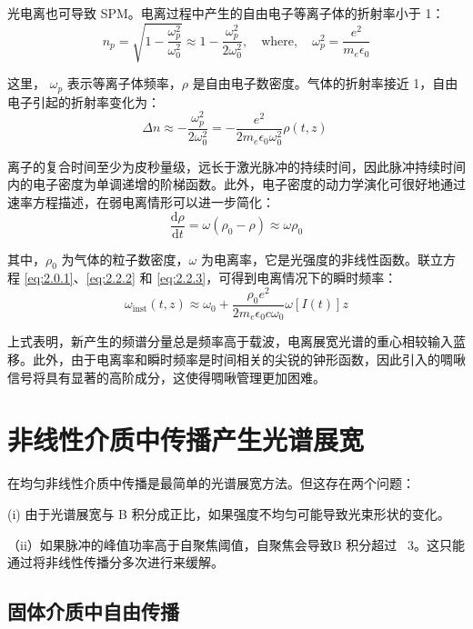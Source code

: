 \documentclass[14pt,a4paper,oneside]{article}
\numberwithin{equation}{subsection}             %
\numberwithin{figure}{subsection}               %
\begin{document}
光电离也可导致 SPM。电离过程中产生的自由电子等离子体的折射率小于 1：
\begin{equation}
    n_p=\sqrt{1-\frac{\omega_p^2}{\omega_0^2}}\approx1-\frac{\omega_p^2}{2\omega_0^2},\quad\text{where},\quad \omega_p^2=\frac{e^2}{m_e\epsilon_0}
    \label{eq:2.2.1}
\end{equation}

这里， $\omega_p$ 表示等离子体频率，$\rho$ 是自由电子数密度。气体的折射率接近 1，自由电子引起的折射率变化为：
\begin{equation}
    \Delta n\approx-\frac{\omega_p^2}{2ω_0^2}=-\frac{e^2}{2m_e\epsilon_0\omega_0^2}\rho(t,z)\
    \label{eq:2.2.2}
\end{equation}

离子的复合时间至少为皮秒量级，远长于激光脉冲的持续时间，因此脉冲持续时间内的电子密度为单调递增的阶梯函数。此外，电子密度的动力学演化可很好地通过速率方程描述，在弱电离情形可以进一步简化：
\begin{equation}
    \frac{\mathrm{d}\rho}{\mathrm{d}t}=\omega (\rho_0-\rho)\approx\omega\rho_0
    \label{eq:2.2.3}
\end{equation}

其中，$\rho_0$ 为气体的粒子数密度，$\omega$ 为电离率，它是光强度的非线性函数。联立方程 \ref{eq:2.0.1}、\ref{eq:2.2.2} 和 \ref{eq:2.2.3}，可得到电离情况下的瞬时频率：
\begin{equation}
    \omega_\mathrm{inst}(t,z)\approx\omega_0+\frac{\rho_{0}e^2}{2m_e\epsilon_0c\omega_0}\omega [I(t)]z
    \label{2.2.4}
\end{equation}

上式表明，新产生的频谱分量总是频率高于载波，电离展宽光谱的重心相较输入蓝移。此外，由于电离率和瞬时频率是时间相关的尖锐的钟形函数，因此引入的啁啾信号将具有显著的高阶成分，这使得啁啾管理更加困难。

\section{非线性介质中传播产生光谱展宽}

在均匀非线性介质中传播是最简单的光谱展宽方法。但这存在两个问题：

(i) 由于光谱展宽与 B 积分成正比，如果强度不均匀可能导致光束形状的变化。

（ii）如果脉冲的峰值功率高于自聚焦阈值，自聚焦会导致B 积分超过 ~3。这只能通过将非线性传播分多次进行来缓解。

\subsection{固体介质中自由传播}
\end{document}

